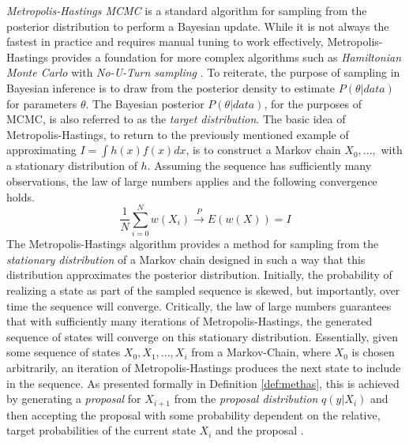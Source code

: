\documentclass[
  12pt,
]{book}
\theoremstyle{definition}
\theoremstyle{definition}
\theoremstyle{definition}
\theoremstyle{remark}
\begin{document}
\emph{Metropolis-Hastings MCMC} is a standard algorithm for sampling from the posterior distribution to perform a Bayesian update.
While it is not always the fastest in practice and requires manual tuning to work effectively, Metropolis-Hastings provides a foundation for more complex algorithms such as \emph{Hamiltonian Monte Carlo} \citep{Brooks2011} with \emph{No-U-Turn sampling} \citep{Homan2014}.
To reiterate, the purpose of sampling in Bayesian inference is to draw from the posterior density to estimate \(P(\theta|data)\) for parameters \(\theta\).
The Bayesian posterior \(P(\theta|data)\), for the purposes of MCMC, is also referred to as the \emph{target distribution}.
The basic idea of Metropolis-Hastings, to return to the previously mentioned example of approximating \(I=\int h(x)f(x)dx\), is to construct a Markov chain \(X_0,...,\) with a stationary distribution of \(h\).
Assuming the sequence has sufficiently many observations, the law of large numbers applies and the following convergence holds.
\[\frac{1}{N}\sum_{i=0}^{N}w(X_{i})\xrightarrow{P} E(w(X))=I\]
The Metropolis-Hastings algorithm provides a method for sampling from the \emph{stationary distribution} of a Markov chain designed in such a way that this distribution approximates the posterior distribution.
Initially, the probability of realizing a state as part of the sampled sequence is skewed, but importantly, over time the sequence will converge.
Critically, the law of large numbers guarantees that with sufficiently many iterations of Metropolis-Hastings, the generated sequence of states will converge on this stationary distribution.
Essentially, given some sequence of states \(X_{0},X_{1},...,X_{i}\) from a Markov-Chain, where \(X_{0}\) is chosen arbitrarily, an iteration of Metropolis-Hastings produces the next state to include in the sequence.
As presented formally in Definition \ref{def:methas}, this is achieved by generating a \emph{proposal} for \(X_{i+1}\) from the \emph{proposal distribution} \(q(y|X_{i})\) and then accepting the proposal with some probability dependent on the relative, target probabilities of the current state \(X_{i}\) and the proposal \citep{Wasserman2004}.
\end{document}
